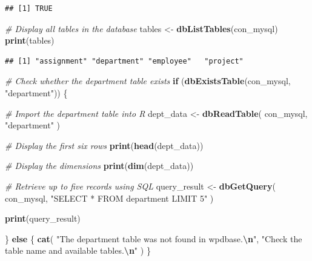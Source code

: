 \documentclass[
]{article}
\newenvironment{Shaded}{\begin{snugshade}}{\end{snugshade}}
\newcommand{\CommentTok}[1]{\textcolor[rgb]{0.56,0.35,0.01}{\textit{#1}}}
\newcommand{\ControlFlowTok}[1]{\textcolor[rgb]{0.13,0.29,0.53}{\textbf{#1}}}
\newcommand{\FunctionTok}[1]{\textcolor[rgb]{0.13,0.29,0.53}{\textbf{#1}}}
\newcommand{\NormalTok}[1]{#1}
\newcommand{\OtherTok}[1]{\textcolor[rgb]{0.56,0.35,0.01}{#1}}
\newcommand{\SpecialCharTok}[1]{\textcolor[rgb]{0.81,0.36,0.00}{\textbf{#1}}}
\newcommand{\StringTok}[1]{\textcolor[rgb]{0.31,0.60,0.02}{#1}}
\begin{document}
\begin{verbatim}
## [1] TRUE
\end{verbatim}

\begin{Shaded}
\begin{Highlighting}[]
\CommentTok{\# Display all tables in the database}
\NormalTok{tables }\OtherTok{\textless{}{-}} \FunctionTok{dbListTables}\NormalTok{(con\_mysql)}
\FunctionTok{print}\NormalTok{(tables)}
\end{Highlighting}
\end{Shaded}

\begin{verbatim}
## [1] "assignment" "department" "employee"   "project"
\end{verbatim}

\begin{Shaded}
\begin{Highlighting}[]
\CommentTok{\# Check whether the department table exists}
\ControlFlowTok{if}\NormalTok{ (}\FunctionTok{dbExistsTable}\NormalTok{(con\_mysql, }\StringTok{"department"}\NormalTok{)) \{}

  \CommentTok{\# Import the department table into R}
\NormalTok{  dept\_data }\OtherTok{\textless{}{-}} \FunctionTok{dbReadTable}\NormalTok{(}
\NormalTok{    con\_mysql,}
    \StringTok{"department"}
\NormalTok{  )}

  \CommentTok{\# Display the first six rows}
  \FunctionTok{print}\NormalTok{(}\FunctionTok{head}\NormalTok{(dept\_data))}

  \CommentTok{\# Display the dimensions}
  \FunctionTok{print}\NormalTok{(}\FunctionTok{dim}\NormalTok{(dept\_data))}

  \CommentTok{\# Retrieve up to five records using SQL}
\NormalTok{  query\_result }\OtherTok{\textless{}{-}} \FunctionTok{dbGetQuery}\NormalTok{(}
\NormalTok{    con\_mysql,}
    \StringTok{"SELECT * FROM department LIMIT 5"}
\NormalTok{  )}

  \FunctionTok{print}\NormalTok{(query\_result)}

\NormalTok{\} }\ControlFlowTok{else}\NormalTok{ \{}
  \FunctionTok{cat}\NormalTok{(}
    \StringTok{"The department table was not found in wpdbase.}\SpecialCharTok{\textbackslash{}n}\StringTok{"}\NormalTok{,}
    \StringTok{"Check the table name and available tables.}\SpecialCharTok{\textbackslash{}n}\StringTok{"}
\NormalTok{  )}
\NormalTok{\}}
\end{Highlighting}
\end{Shaded}
\end{document}
